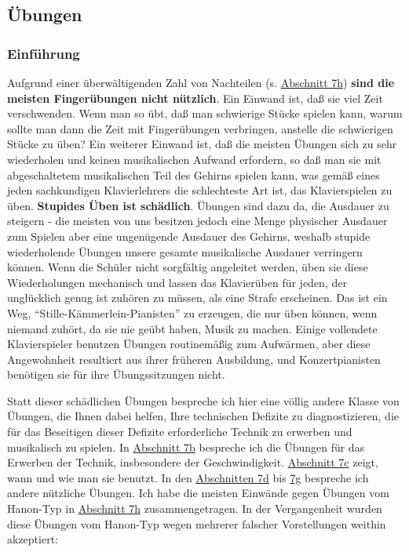 
\subsection{Übungen}
\label{c1iii7}

\subsubsection{Einführung}
\label{c1iii7a}

Aufgrund einer überwältigenden Zahl von Nachteilen (s. \hyperref[c1iii7h]{Abschnitt 7h}) \textbf{sind die meisten Fingerübungen nicht nützlich}.
Ein Einwand ist, daß sie viel Zeit verschwenden.
Wenn man so übt, daß man schwierige Stücke spielen kann, warum sollte man dann die Zeit mit Fingerübungen verbringen, anstelle die schwierigen Stücke zu üben?
Ein weiterer Einwand ist, daß die meisten Übungen sich zu sehr wiederholen und keinen musikalischen Aufwand erfordern, so daß man sie mit abgeschaltetem musikalischen Teil des Gehirns spielen kann, was gemäß eines jeden sachkundigen Klavierlehrers die schlechteste Art ist, das Klavierspielen zu üben.
\textbf{Stupides Üben ist schädlich}.
Übungen sind dazu da, die Ausdauer zu steigern - die meisten von uns besitzen jedoch eine Menge physischer Ausdauer zum Spielen aber eine ungenügende Ausdauer des Gehirns, weshalb stupide wiederholende Übungen unsere gesamte musikalische Ausdauer verringern können.
Wenn die Schüler nicht sorgfältig angeleitet werden, üben sie diese Wiederholungen mechanisch und lassen das Klavierüben für jeden, der unglücklich genug ist zuhören zu müssen, als eine Strafe erscheinen.
Das ist ein Weg, \enquote{Stille-Kämmerlein-Pianisten} zu erzeugen, die nur üben können, wenn niemand zuhört, da sie nie geübt haben, Musik zu machen.
Einige vollendete Klavierspieler benutzen Übungen routinemäßig zum Aufwärmen, aber diese Angewohnheit resultiert aus ihrer früheren Ausbildung, und Konzertpianisten benötigen sie für ihre Übungssitzungen nicht.

Statt dieser schädlichen Übungen bespreche ich hier eine völlig andere Klasse von Übungen, die Ihnen dabei helfen, Ihre technischen Defizite zu diagnostizieren, die für das Beseitigen dieser Defizite erforderliche Technik zu erwerben und musikalisch zu spielen.
In \hyperref[c1iii7b]{Abschnitt 7b} bespreche ich die Übungen für das Erwerben der Technik, insbesondere der Geschwindigkeit.
\hyperref[c1iii7c]{Abschnitt 7c} zeigt, wann und wie man sie benutzt.
In den \hyperref[c1iii7d]{Abschnitten 7d} bis \hyperref[c1iii7g]{7g} bespreche ich andere nützliche Übungen.
Ich habe die meisten Einwände gegen Übungen vom Hanon-Typ in \hyperref[c1iii7h]{Abschnitt 7h} zusammengetragen.
In der Vergangenheit wurden diese Übungen vom Hanon-Typ wegen mehrerer falscher Vorstellungen weithin akzeptiert:

